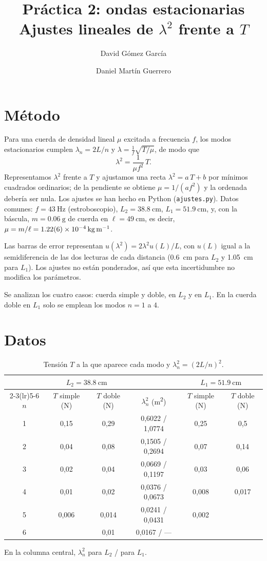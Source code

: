 \documentclass[a4paper,11pt]{article}
\title{Práctica 2: ondas estacionarias\\[2pt]\large Ajustes lineales de $\lambda^{2}$ frente a $T$}
\author{David Gómez García \and Daniel Martín Guerrero}
\date{}
\begin{document}
\maketitle

\section*{Método}
Para una cuerda de densidad lineal $\mu$ excitada a frecuencia $f$, los modos
estacionarios cumplen $\lambda_n=2L/n$ y $\lambda=\frac{1}{f}\sqrt{T/\mu}$, de
modo que
\[
  \lambda^{2}=\frac{1}{\mu f^{2}}\,T .
\]
Representamos $\lambda^{2}$ frente a $T$ y ajustamos una recta
$\lambda^{2}=a\,T+b$ por mínimos cuadrados ordinarios; de la pendiente se
obtiene $\mu=1/(a f^{2})$ y la ordenada debería ser nula. Los ajustes se han
hecho en Python (\texttt{ajustes.py}). Datos comunes:
$f=\SI{43}{\hertz}$ (estroboscopio), $L_2=\SI{38,8}{\centi\meter}$,
$L_1=\SI{51,9}{\centi\meter}$, y, con la báscula, $m=\SI{0,06}{\gram}$ de
cuerda en $\ell=\SI{49}{\centi\meter}$, es decir,
$\mu=m/\ell=\SI{1,22 \pm 0,06 e-4}{\kilogram\per\meter}$.

Las barras de error representan $u(\lambda^{2})=2\lambda^{2}u(L)/L$, con $u(L)$ igual a la semidiferencia de
las dos lecturas de cada distancia (\SI{0,6}{\centi\meter} para $L_2$ y
\SI{1,05}{\centi\meter} para $L_1$). Los ajustes no están ponderados, así que
esta incertidumbre no modifica los parámetros.

Se analizan los cuatro casos: cuerda simple y doble, en $L_2$ y en $L_1$. En
la cuerda doble en $L_1$ solo se emplean los modos $n=1$ a $4$.

\section*{Datos}
\begin{table}[H]
\centering
\caption{Tensión $T$ a la que aparece cada modo y $\lambda_n^{2}=(2L/n)^{2}$.}
\begin{tabular}{c c c c c c}
\toprule
 & \multicolumn{2}{c}{$L_2=\SI{38,8}{\centi\meter}$} & & \multicolumn{2}{c}{$L_1=\SI{51,9}{\centi\meter}$} \\
\cmidrule(lr){2-3}\cmidrule(lr){5-6}
$n$ & $T$ simple (N) & $T$ doble (N) & $\lambda_n^{2}$ (\si{\meter\squared}) & $T$ simple (N) & $T$ doble (N) \\
\midrule
1 & 0,15  & 0,29  & 0,6022 / 1,0774 & 0,25  & 0,5   \\
2 & 0,04  & 0,08  & 0,1505 / 0,2694 & 0,07  & 0,14  \\
3 & 0,02  & 0,04  & 0,0669 / 0,1197 & 0,03  & 0,06  \\
4 & 0,01  & 0,02  & 0,0376 / 0,0673 & 0,008 & 0,017 \\
5 & 0,006 & 0,014 & 0,0241 / 0,0431 & 0,002 &       \\
6 &       & 0,01  & 0,0167 / ---    &       &       \\
\bottomrule
\end{tabular}

\smallskip
{\footnotesize En la columna central, $\lambda_n^{2}$ para $L_2$ / para $L_1$.}
\end{table}
\end{document}
